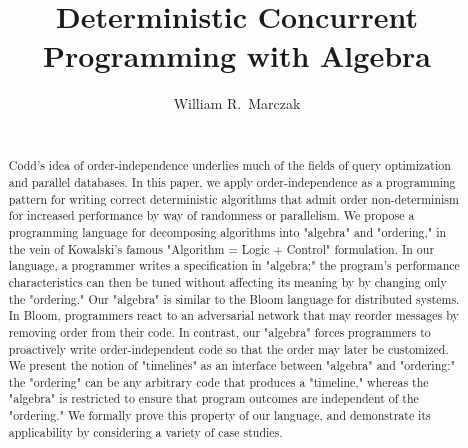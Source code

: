 \documentclass{sig-alternate}
\begin{document}
\title{Deterministic Concurrent Programming with Algebra}


%


\author{
\alignauthor William R.\ Marczak\\
\\
}

\toappear{}

\maketitle

\begin{abstract}
Codd's idea of order-independence underlies much of the fields of query
optimization and parallel databases.  In this paper, we apply
order-independence as a programming pattern for writing correct deterministic algorithms that admit order non-determinism for increased performance by way of randomness or parallelism.
We propose a programming language for decomposing algorithms
into "algebra" and "ordering," in the vein of Kowalski's famous "Algorithm
= Logic + Control" formulation.  In our language, a programmer writes a
specification in "algebra;" the program's performance characteristics can
then be tuned without affecting its meaning by by changing only the "ordering."
Our
"algebra" is similar to the Bloom language for distributed systems.  In
Bloom, programmers react to an adversarial network that may reorder
messages by removing order from their code.  In contrast, our "algebra"
forces programmers to proactively write order-independent code so that the
order may later be customized.  We present the notion of "timelines" as an
interface between "algebra" and "ordering:" the "ordering" can be any
arbitrary code that produces a "timeline," whereas the "algebra" is
restricted to ensure that program outcomes are independent of the
"ordering."  We formally prove this property of our language, and
demonstrate its applicability by considering a variety of case studies.
\end{abstract}








%

\end{document}
